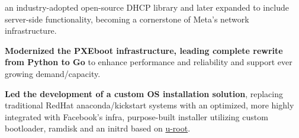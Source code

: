 \begin{cventries}
{\begin{cvitems}
{                  an industry-adopted open-source DHCP library and later expanded to include server-side functionality,
                  becoming a cornerstone of Meta's network infrastructure.}
      \item {\textbf{Modernized the PXEboot infrastructure, leading complete rewrite from Python
                    to Go} to enhance performance and reliability and support ever growing demand/capacity.}
      \item {\textbf{Led the development of a custom OS installation solution}, replacing traditional RedHat
                  anaconda/kickstart systems with an optimized, more highly integrated with Facebook's infra, purpose-built installer utilizing custom bootloader, ramdisk and an initrd based on \href{https://github.com/u-root/u-root}{u-root}.}
    \end{cvitems}
  }


\end{cventries}
